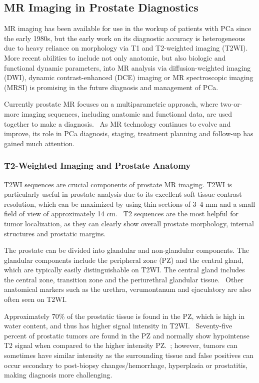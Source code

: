 ﻿\subsection{MR Imaging in Prostate Diagnostics}
MR imaging has been available for use in the workup of patients with PCa since
the early 1980s, but the early work on its diagnostic accuracy is heterogeneous
due to heavy reliance on morphology via T1 and T2-weighted imaging (T2WI). More
recent abilities to include not only anatomic, but also biologic and functional
dynamic parameters, into MR analysis via diffusion-weighted imaging (DWI),
dynamic contrast-enhanced (DCE) imaging or MR spectroscopic imaging (MRSI) is
promising in the future diagnosis and management of PCa.

Currently prostate MR focuses on a multiparametric approach, where two-or-more
imaging sequences, including anatomic and functional data, are used together to
make a diagnosis.~\cite{Barentsz2012} As MR technology continues to evolve and
improve, its role in PCa diagnosis, staging, treatment planning and follow-up
has gained much attention.

\subsubsection{T2-Weighted Imaging and Prostate Anatomy}
T2WI sequences are crucial components of prostate MR imaging.  T2WI is
particularly useful in prostate analysis due to its excellent soft tissue
contrast resolution, which can be maximized by using thin sections of 3--4 mm
and a small field of view of approximately 14 cm.~\cite{Gupta2013,Bonekamp2011}
T2 sequences are the most helpful for tumor localization, as they can clearly
show overall prostate morphology, internal structures and prostatic
margins.~\cite{Gupta2013}

The prostate can be divided into glandular and non-glandular components. The
glandular components include the peripheral zone (PZ) and the central gland,
which are typically easily distinguishable on T2WI. The central gland includes
the central zone, transition zone and the periurethral glandular
tissue.~\cite{Jung2012} Other anatomical markers such as the urethra,
verumontanum and ejaculatory are also often seen on T2WI. 

Approximately 70\% of the prostatic tissue is found in the PZ, which is high in
water content, and thus has higher signal intensity in T2WI.~\cite{Jung2012}
Seventy-five percent of prostatic tumors are found in the PZ and normally show
hypointense T2 signal when compared to the higher intensity
PZ.~\cite{Hricak2007,Hegde2013}; however, tumors can sometimes have similar
intensity as the surrounding tissue and false positives can occur secondary to
post-biopsy changes/hemorrhage, hyperplasia or prostatitis, making diagnosis
more challenging.~\cite{Hegde2013}

